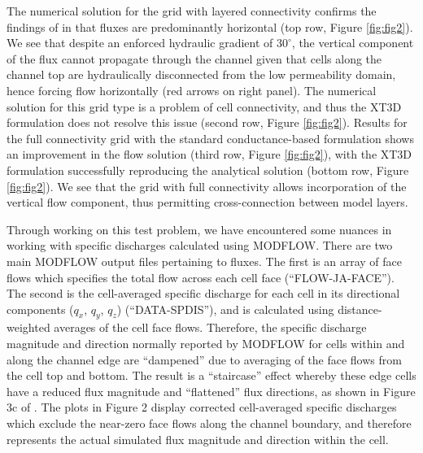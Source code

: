 \documentclass{article}
\begin{document}
The numerical solution for the grid with layered connectivity confirms the findings of \cite{bardot2022} in that fluxes are predominantly horizontal (top row, Figure \ref{fig:fig2}). We see that despite an enforced hydraulic gradient of $30^{\circ}$, the vertical component of the flux cannot propagate through the channel given that cells along the channel top are hydraulically disconnected from the low permeability domain, hence forcing flow horizontally (red arrows on right panel). The numerical solution for this grid type is a problem of cell connectivity, and thus the XT3D formulation does not resolve this issue (second row, Figure \ref{fig:fig2}). Results for the full connectivity grid with the standard conductance-based formulation shows an improvement in the flow solution (third row, Figure \ref{fig:fig2}), with the XT3D formulation successfully reproducing the analytical solution (bottom row, Figure \ref{fig:fig2}). We see that the grid with full connectivity allows incorporation of the vertical flow component, thus permitting cross-connection between model layers.

Through working on this test problem, we have encountered some nuances in working with specific discharges calculated using MODFLOW. There are two main MODFLOW output files pertaining to fluxes. The first is an array of face flows which specifies the total flow across each cell face (``FLOW-JA-FACE''). The second is the cell-averaged specific discharge for each cell in its directional components ($q_{x}$, $q_{y}$, $q_{z}$) (``DATA-SPDIS''), and is calculated using distance-weighted averages of the cell face flows. Therefore, the specific discharge magnitude and direction normally reported by MODFLOW for cells within and along the channel edge are ``dampened'' due to averaging of the face flows from the cell top and bottom. The result is a ``staircase'' effect whereby these edge cells have a reduced flux magnitude and ``flattened'' flux directions, as shown in Figure 3c of \cite{bardot2022}. The plots in Figure 2 display corrected cell-averaged specific discharges which exclude the near-zero face flows along the channel boundary, and therefore represents the actual simulated flux magnitude and direction within the cell. 

\end{document}
